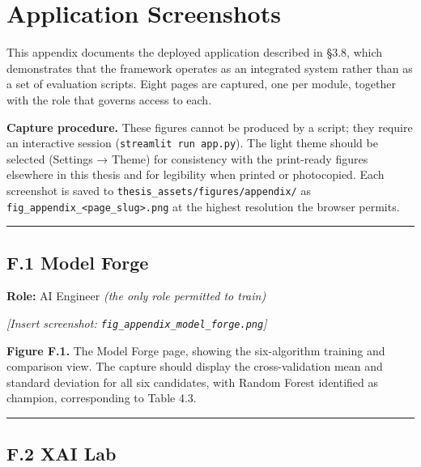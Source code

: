 \hypertarget{application-screenshots}{%
\chapter{Application Screenshots}\label{application-screenshots}}

This appendix documents the deployed application described in §3.8, which demonstrates that the framework operates as an integrated system rather than as a set of evaluation scripts. Eight pages are captured, one per module, together with the role that governs access to each.

\textbf{Capture procedure.} These figures cannot be produced by a script; they require an interactive session (\texttt{streamlit\ run\ app.py}). The light theme should be selected (Settings → Theme) for consistency with the print-ready figures elsewhere in this thesis and for legibility when printed or photocopied. Each screenshot is saved to \texttt{thesis\_assets/figures/appendix/} as \texttt{fig\_appendix\_\textless{}page\_slug\textgreater{}.png} at the highest resolution the browser permits.

\begin{center}\rule{0.5\linewidth}{0.5pt}\end{center}

\hypertarget{f.1-model-forge}{%
\section{F.1 Model Forge}\label{f.1-model-forge}}

\textbf{Role:} AI Engineer \emph{(the only role permitted to train)}

\emph{{[}Insert screenshot: \texttt{fig\_appendix\_model\_forge.png}{]}}

\textbf{Figure F.1.} The Model Forge page, showing the six-algorithm training and comparison view. The capture should display the cross-validation mean and standard deviation for all six candidates, with Random Forest identified as champion, corresponding to Table 4.3.

\begin{center}\rule{0.5\linewidth}{0.5pt}\end{center}

\hypertarget{f.2-xai-lab}{%
\section{F.2 XAI Lab}\label{f.2-xai-lab}}

